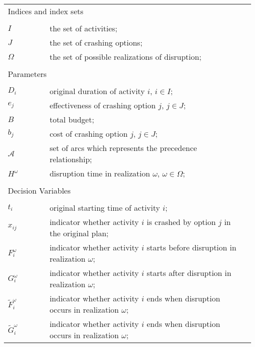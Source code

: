 \documentclass[11pt]{article}
\begin{document}
	\begin{table}[H]
		\begin{tabular}{ l l l l }
			\multicolumn{4}{l}{Indices and index sets} \\
			\\
			\(I\) & \(\qquad\) & the set of activities;&\\
			\(J\) & \(\qquad\) & the set of crashing options;&\\
			\(\Omega\) & \(\qquad\) & the set of possible realizations of disruption;&\\
			\\
			\multicolumn{4}{l}{Parameters} \\
			\\
			\(D_{i}\)& \(\qquad\) & original duration of activity \(i\), \(i \in I\);&\\
			\(e_{j}\) & \(\qquad\) & effectiveness of crashing option \(j\), \(j \in J\);&\\
			\(B\) & \(\qquad\) & total budget;&\\
			\(b_{j}\) & \(\qquad\) & cost of crashing option \(j\), \(j \in J\);&\\
			\(\mathcal{A}\) &\(\qquad\) & set of arcs which represents the precedence relationship;&\\
			\(H^\omega\) &\(\qquad\) & disruption time in realization \(\omega\), \(\omega \in \Omega\);&\\
			\\
			\multicolumn{4}{l}{Decision Variables}\\
			\\
			\(t_{i}\) & \(\qquad\) & original starting time of activity \(i\);&\\
			\(x_{ij}\) & \(\qquad\) & indicator whether activity \(i\) is crashed by option \(j\) in the original plan; &\\
			\(F_i^\omega\) & \(\qquad\) & indicator whether activity \(i\) starts before disruption in realization \(\omega\);&\\
			\(G_i^\omega\) & \(\qquad\) & indicator whether activity \(i\) starts after disruption in realization \(\omega\);&\\
			\(\tilde{F}_i^\omega\) & \(\qquad\) & indicator whether activity \(i\) ends when disruption occurs in realization \(\omega\); &\\
			\(\tilde{G}_i^\omega\) & \(\qquad\) & indicator whether activity \(i\) ends when disruption occurs in realization \(\omega\); &\\
		\end{tabular}
	\end{table}
	
\end{document}
